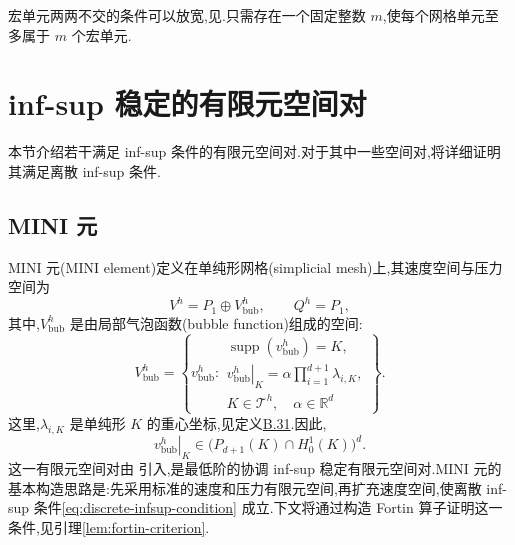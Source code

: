 \begin{note}[放宽宏单元互不相交的条件]\label{note:macroelement-overlap}
宏单元两两不交的条件可以放宽,见\textcite{Stenberg1987,Stenberg1990}.只需存在一个固定整数 $m$,使每个网格单元至多属于 $m$ 个宏单元.
\end{note}

\section{inf-sup 稳定的有限元空间对}\label{sec:inf-sup-stable-pairs}

\begin{note}[内容]\label{note:inf-sup-stable-pairs-contents}
本节介绍若干满足 inf-sup 条件的有限元空间对.对于其中一些空间对,将详细证明其满足离散 inf-sup 条件.
\end{note}

\subsection{MINI 元}\label{subsec:mini-element}

\begin{note}[MINI 元]\label{note:mini-element}
MINI 元(MINI element)定义在单纯形网格(simplicial mesh)上,其速度空间与压力空间为
\begin{equation}\label{eq:mini-element-spaces}
  V^h=P_1\oplus V_{\mathrm{bub}}^h,
  \qquad Q^h=P_1,
\end{equation}
其中,$V_{\mathrm{bub}}^h$ 是由局部气泡函数(bubble function)组成的空间:
\[
  V_{\mathrm{bub}}^h
  =\left\{v_{\mathrm{bub}}^h:
      \begin{gathered}
      \operatorname{supp}(v_{\mathrm{bub}}^h)=K,\\
      \left.v_{\mathrm{bub}}^h\right|_K
        =\alpha\prod_{i=1}^{d+1}\lambda_{i,K},\\
      K\in\mathcal{T}^h,\quad \alpha\in\mathbb{R}^d
      \end{gathered}\right\}.
\]
这里,$\lambda_{i,K}$ 是单纯形 $K$ 的重心坐标,见定义\hyperref[def:appendix-b-31]{B.31}.因此,
\[
  \left.v_{\mathrm{bub}}^h\right|_K
  \in\bigl(P_{d+1}(K)\cap H_0^1(K)\bigr)^d.
\]
这一有限元空间对由\textcite{ArnoldBrezziFortin1984} 引入,是最低阶的协调 inf-sup 稳定有限元空间对.MINI 元的基本构造思路是:先采用标准的速度和压力有限元空间,再扩充速度空间,使离散 inf-sup 条件\cref{eq:discrete-infsup-condition} 成立.下文将通过构造 Fortin 算子证明这一条件,见引理\ref{lem:fortin-criterion}.
\end{note}

